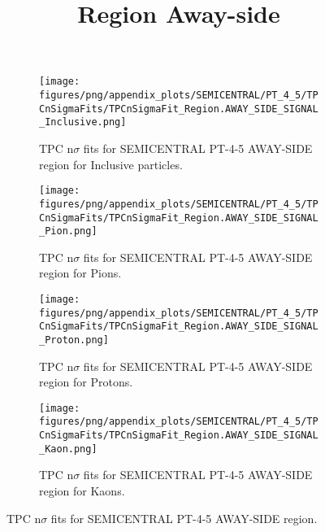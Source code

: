             \begin{figure}[H]
                \title{Region Away-side}
                \begin{subfigure}[b]{0.5\textwidth}
                    \centering
                    \texttt{[image: figures/png/appendix\_plots/SEMICENTRAL/PT\_4\_5/TPCnSigmaFits/TPCnSigmaFit\_Region.AWAY\_SIDE\_SIGNAL\_Inclusive.png]}
                    \caption{TPC n$\sigma$ fits for SEMICENTRAL PT-4-5 AWAY-SIDE region for Inclusive particles.}
                    \label{fig:appendix_SEMICENTRAL_PT-4-5_AWAY_SIDE_SIGNAL_Inclusive}
                \end{subfigure}
                \begin{subfigure}[b]{0.5\textwidth}
                    \centering
                    \texttt{[image: figures/png/appendix\_plots/SEMICENTRAL/PT\_4\_5/TPCnSigmaFits/TPCnSigmaFit\_Region.AWAY\_SIDE\_SIGNAL\_Pion.png]}
                    \caption{TPC n$\sigma$ fits for SEMICENTRAL PT-4-5 AWAY-SIDE region for Pions.}
                    \label{fig:appendix_SEMICENTRAL_PT-4-5_AWAY_SIDE_SIGNAL_Pion}
                \end{subfigure}
                \begin{subfigure}[b]{0.5\textwidth}
                    \centering
                    \texttt{[image: figures/png/appendix\_plots/SEMICENTRAL/PT\_4\_5/TPCnSigmaFits/TPCnSigmaFit\_Region.AWAY\_SIDE\_SIGNAL\_Proton.png]}
                    \caption{TPC n$\sigma$ fits for SEMICENTRAL PT-4-5 AWAY-SIDE region for Protons.}
                    \label{fig:appendix_SEMICENTRAL_PT-4-5_AWAY_SIDE_SIGNAL_Proton}
                \end{subfigure}
                \begin{subfigure}[b]{0.5\textwidth}
                    \centering
                    \texttt{[image: figures/png/appendix\_plots/SEMICENTRAL/PT\_4\_5/TPCnSigmaFits/TPCnSigmaFit\_Region.AWAY\_SIDE\_SIGNAL\_Kaon.png]}
                    \caption{TPC n$\sigma$ fits for SEMICENTRAL PT-4-5 AWAY-SIDE region for Kaons.}
                    \label{fig:appendix_SEMICENTRAL_PT-4-5_AWAY_SIDE_SIGNAL_Kaon}
                \end{subfigure}
                \caption{TPC n$\sigma$ fits for SEMICENTRAL PT-4-5 AWAY-SIDE region.}
                \label{fig:appendix_SEMICENTRAL_PT-4-5_AWAY_SIDE_SIGNAL}
            \end{figure}
